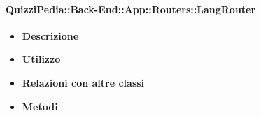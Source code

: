 \paragraph{QuizziPedia::Back-End::App::Routers::LangRouter}
	\begin{itemize}
		\item \textbf{Descrizione} \\
		\item \textbf{Utilizzo} \\
		\item \textbf{Relazioni con altre classi} \\
		\item \textbf{Metodi} \\
	\end{itemize}
